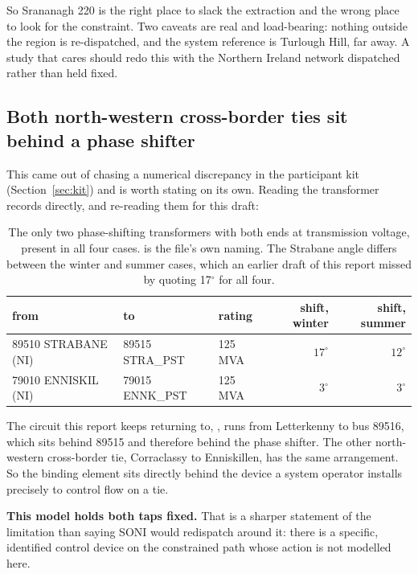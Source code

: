 \documentclass[11pt,a4paper]{article}
\begin{document}
So Srananagh 220 is the right place to slack the extraction and the wrong place
to look for the constraint. Two caveats are real and load-bearing: nothing
outside the region is re-dispatched, and the system reference is Turlough Hill,
far away. A study that cares should redo this with the Northern Ireland network
dispatched rather than held fixed.

\subsection{Both north-western cross-border ties sit behind a phase shifter}
\label{sec:pst}

This came out of chasing a numerical discrepancy in the participant kit
(Section~\ref{sec:kit}) and is worth stating on its own. Reading the
transformer records directly, and re-reading them for this draft:

\begin{table}[H]\centering\small
\begin{tabular}{lllrr}
\toprule
\textbf{from} & \textbf{to} & \textbf{rating} & \textbf{shift, winter} &
\textbf{shift, summer} \\
\midrule
89510 STRABANE (NI)  & 89515 STRA\_PST & 125 MVA & $17^\circ$ & $12^\circ$ \\
79010 ENNISKIL (NI)  & 79015 ENNK\_PST & 125 MVA & $3^\circ$  & $3^\circ$ \\
\bottomrule
\end{tabular}
\caption{The only two phase-shifting transformers with both ends at
transmission voltage, present in all four cases.  is the file's own
naming. The Strabane angle differs between the winter and summer cases, which
an earlier draft of this report missed by quoting 17$^\circ$ for all four.}
\end{table}

The circuit this report keeps returning to, , runs from
Letterkenny to bus 89516, which sits behind 89515 and therefore behind the
phase shifter. The other north-western cross-border tie, Corraclassy to
Enniskillen, has the same arrangement. So the binding element sits directly
behind the device a system operator installs precisely to control flow on a
tie.

\textbf{This model holds both taps fixed.} That is a sharper statement of the
limitation than saying SONI would redispatch around it: there is a specific,
identified control device on the constrained path whose action is not modelled
here.
\end{document}
